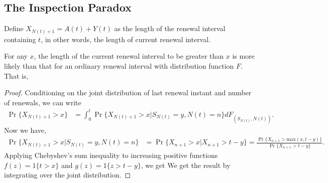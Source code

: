 \documentclass[a4paper,10pt,english]{article}
\begin{document}
\subsection{The Inspection Paradox}
Define $X_{N(t)+1}=A(t)+Y(t)$ as the length of the renewal interval containing $t$, in other words, the length of current renewal interval. 
\begin{thm}
For any $x$, the length of the current renewal interval to be greater than $x$ is more likely than that for an ordinary renewal interval with distribution function $F$.  
That is, %
\end{thm}
\begin{proof}
Conditioning on the joint distribution of last renewal instant and number of renewals, we can write 
\begin{align*}
\Pr\{X_{N(t)+1}>x\}&= \int_{0}^t\Pr\{X_{N(t)+1} > x | S_{N(t)} = y, N(t)=n\}dF_{(S_{N(t)}, N(t))}.
\end{align*}
Now we have,
\begin{align*}
\Pr\{X_{N(t)+1}>x | S_{N(t)}=y, N(t)=n\} %
& = \Pr\{X_{n+1}>x | X_{n+1}>t-y\} = \frac{\Pr\{X_{n+1}>\text{max}(x,t-y)\}}{\Pr\{X_{n+1}>t-y\}}.%
\end{align*}
Applying Chebyshev's sum inequality to increasing positive functions $f(z) = 1\{t > x\}$ and $g(z) = 1\{z > t-y\}$, we get 
We get the result by integrating over the joint distribution.  
\end{proof}
\end{document}

